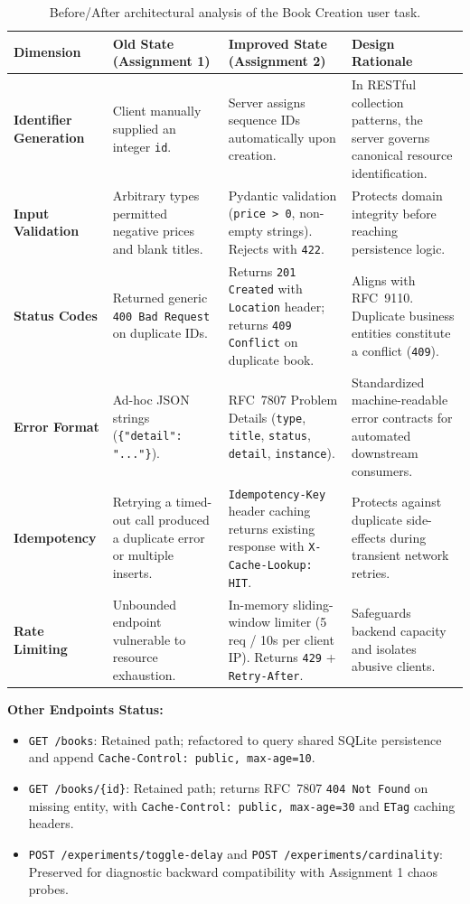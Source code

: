 \documentclass[11pt,a4paper]{article}
\begin{document}
\begin{table}[h!]
\centering
\small
\renewcommand{\arraystretch}{1.25}
\begin{tabularx}{\textwidth}{p{3.2cm} p{3.8cm} p{4.2cm} X}
\toprule
\textbf{Dimension} & \textbf{Old State (Assignment 1)} & \textbf{Improved State (Assignment 2)} & \textbf{Design Rationale} \\
\midrule
\textbf{Identifier Generation} & Client manually supplied an integer \texttt{id}. & Server assigns sequence IDs automatically upon creation. & In RESTful collection patterns, the server governs canonical resource identification. \\
\textbf{Input Validation} & Arbitrary types permitted negative prices and blank titles. & Pydantic validation (\texttt{price > 0}, non-empty strings). Rejects with \texttt{422}. & Protects domain integrity before reaching persistence logic. \\
\textbf{Status Codes} & Returned generic \texttt{400 Bad Request} on duplicate IDs. & Returns \texttt{201 Created} with \texttt{Location} header; returns \texttt{409 Conflict} on duplicate book. & Aligns with RFC~9110. Duplicate business entities constitute a conflict (\texttt{409}). \\
\textbf{Error Format} & Ad-hoc JSON strings (\texttt{\{"detail": "..."\}}). & RFC~7807 Problem Details (\texttt{type}, \texttt{title}, \texttt{status}, \texttt{detail}, \texttt{instance}). & Standardized machine-readable error contracts for automated downstream consumers. \\
\textbf{Idempotency} & Retrying a timed-out call produced a duplicate error or multiple inserts. & \texttt{Idempotency-Key} header caching returns existing response with \texttt{X-Cache-Lookup: HIT}. & Protects against duplicate side-effects during transient network retries. \\
\textbf{Rate Limiting} & Unbounded endpoint vulnerable to resource exhaustion. & In-memory sliding-window limiter (5 req / 10s per client IP). Returns \texttt{429} + \texttt{Retry-After}. & Safeguards backend capacity and isolates abusive clients. \\
\bottomrule
\end{tabularx}
\caption{Before/After architectural analysis of the Book Creation user task.}
\label{tab:before_after}
\end{table}

\noindent\textbf{Other Endpoints Status:}
\begin{itemize}\setlength{\itemsep}{0pt}
    \item \texttt{GET /books}: Retained path; refactored to query shared SQLite persistence and append \texttt{Cache-Control: public, max-age=10}.
    \item \texttt{GET /books/\{id\}}: Retained path; returns RFC~7807 \texttt{404 Not Found} on missing entity, with \texttt{Cache-Control: public, max-age=30} and \texttt{ETag} caching headers.
    \item \texttt{POST /experiments/toggle-delay} and \texttt{POST /experiments/cardinality}: Preserved for diagnostic backward compatibility with Assignment 1 chaos probes.
\end{itemize}
\end{document}

